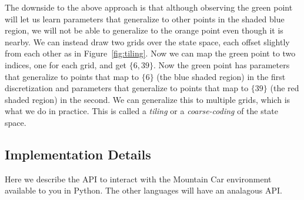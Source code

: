 The downside to the above approach is that although observing the green point will let us learn parameters that generalize to other points in the shaded blue region, we will not be able to generalize to the orange point even though it is nearby. We can instead draw two grids over the state space, each offset slightly from each other as in Figure~\ref{fig:tiling}. Now we can map the green point to two indices, one for each grid, and get $\{6, 39\}$. Now the green point has parameters that generalize to points that map to $\{6\}$ (the blue shaded region) in the first discretization and parameters that generalize to points that map to $\{39\}$ (the red shaded region) in the second. We can generalize this to multiple grids, which is what we do in practice. This is called a \emph{tiling} or a \emph{coarse-coding} of the state space. 


\subsection{Implementation Details}
Here we describe the API to interact with the Mountain Car environment available to you in Python. The other languages will have an analagous API.

